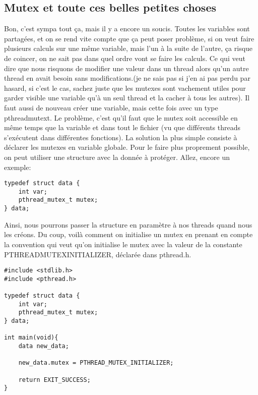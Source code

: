 \documentclass[a4paper]{article}
\begin{document}
\subsection{Mutex et toute ces belles petites choses}
Bon, c'est sympa tout ça, mais il y a encore un soucis. Toutes les variables sont partagées, et on se rend vite compte que ça peut poser problème, si on veut faire plusieurs calculs sur une même variable, mais l'un à la suite de l'autre, ça risque de coincer, on ne sait pas dans quel ordre vont se faire les calculs. Ce qui veut dire que nous risquons de modifier une valeur dans un thread alors qu'un autre thread en avait besoin sans modifications.(je ne sais pas si j'en ai pas perdu par hasard, si c'est le cas, sachez juste que les mutexes sont vachement utiles pour garder visible une variable qu'à un seul thread et la cacher à tous les autres).\newline
Il faut aussi de nouveau créer une variable, mais cette fois avec un type \guillemotleft{}pthread\textunderscore{}mutex\textunderscore{}t\guillemotright{}.\newline
Le problème, c'est qu'il faut que le mutex soit accessible en même temps que la variable et dans tout le fichier (vu que différents threads s'exécutent dans différentes fonctions). La solution la plus simple consiste à déclarer les mutexes en variable globale. Pour le faire plus proprement possible, on peut utiliser une structure avec la donnée à protéger. Allez, encore un exemple:
\begin{lstlisting}
typedef struct data {
    int var;
    pthread_mutex_t mutex;
} data;
\end{lstlisting}
Ainsi, nous pourrons passer la structure en paramètre à nos threads quand nous les créons.\newline
Du coup, voilà comment on initialise un mutex en prenant en compte la convention qui veut qu'on initialise le mutex avec la valeur de la constante PTHREAD\textunderscore{}MUTEX\textunderscore{}INITIALIZER, déclarée dans pthread.h.
\begin{lstlisting}
#include <stdlib.h>
#include <pthread.h>

typedef struct data {
    int var;
    pthread_mutex_t mutex;
} data;

int main(void){
    data new_data;

    new_data.mutex = PTHREAD_MUTEX_INITIALIZER;

    return EXIT_SUCCESS;
}
\end{lstlisting}
\end{document}
